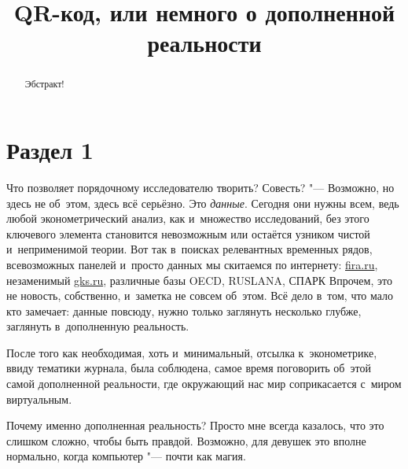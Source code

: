 \documentclass[final,pdftex]{../../template/epsilonj}
\begin{document}
	
	\begin{frontmatter}
		\title{QR-код, или немного о дополненной реальности}
		
		\begin{aug}
			\author{ }%
			
			
			\address{НИУ ВШЭ, Москва.}
		\end{aug}
		
		\begin{abstract}
			Эбстракт!
		\end{abstract}
		
		\begin{keyword}
		\end{keyword}
		
	\end{frontmatter}
	
	
	\section{Раздел 1}


Что позволяет порядочному исследователю творить? Совесть? "--- Возможно, но здесь не об~этом, здесь всё серьёзно. Это \textit{данные}. Сегодня они нужны всем, ведь любой эконометрический анализ, как и~множество исследований, без этого ключевого элемента становится невозможным или остаётся узником чистой и~неприменимой теории. Вот так в~поисках релевантных временных рядов, всевозможных панелей и~просто данных мы скитаемся по интернету: \href{http://www.fira.ru}{fira.ru}, незаменимый \href{http://www.gks.ru}{gks.ru}, различные базы OECD, RUSLANA, СПАРК\ldotst{} Впрочем, это не новость, собственно, и~заметка не совсем об~этом. Всё дело в~том, что мало кто замечает: данные повсюду, нужно только заглянуть несколько глубже, заглянуть в~дополненную реальность. 

После того как необходимая, хоть и~минимальный, отсылка к~эконометрике, ввиду тематики журнала, была соблюдена, самое время поговорить об~этой самой дополненной реальности, где окружающий нас мир соприкасается с~миром виртуальным.

Почему именно дополненная реальность? Просто мне всегда казалось, что это слишком сложно, чтобы быть правдой. Возможно, для девушек это вполне нормально, когда компьютер "--- почти как магия.
\end{document}
